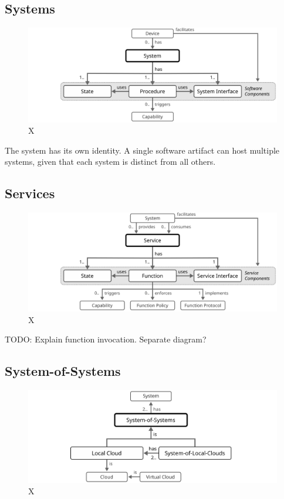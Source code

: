 \subsection{Systems}

\begin{figure}[ht!]
  \centering
  \includegraphics{figures/system}
  \caption{
    X
  }
  \label{fig:system}
\end{figure}

The system has its own identity. A single software artifact can host multiple systems, given that each system is distinct from all others.

\subsection{Services}

\begin{figure}[ht!]
  \centering
  \includegraphics{figures/service}
  \caption{
    X
  }
  \label{fig:service}
\end{figure}

TODO: Explain function invocation. Separate diagram?

\subsection{System-of-Systems}

\begin{figure}[ht!]
  \centering
  \includegraphics{figures/system-of-systems}
  \caption{
    X
  }
  \label{fig:system-of-systems}
\end{figure}

